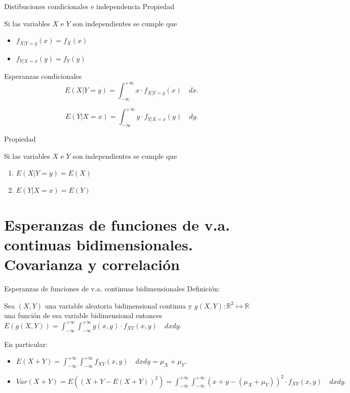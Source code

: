 \documentclass[
  ignorenonframetext,
]{beamer}
\providecommand{\tightlist}{%
  \setlength{\itemsep}{0pt}\setlength{\parskip}{0pt}}
\begin{document}
\begin{frame}{Distibuciones condicionales e independencia}
\protect\hypertarget{distibuciones-condicionales-e-independencia}{}
Propiedad

Si las variables \(X\) e \(Y\) son independientes se cumple que

\begin{itemize}
\tightlist
\item
  \(f_{X|Y=y}(x)=f_X(x)\)
\item
  \(f_{Y|X=x}(y)=f_Y(y)\)
\end{itemize}
\end{frame}

\begin{frame}{Esperanzas condicionales}
\protect\hypertarget{esperanzas-condicionales}{}
\[E(X|Y=y)=\int_{-\infty}^{+\infty} x\cdot f_{X|Y=y}(x) \quad dx.\]

\[E(Y|X=x)=\int_{-\infty}^{+\infty} y\cdot f_{Y|X=x}(y) \quad dy.\]

Propiedad

Si las variables \(X\) e \(Y\) son independientes se cumple que

\begin{enumerate}
\tightlist
\item
  \(E(X|Y=y)=E(X)\)
\item
  \(E(Y|X=x)=E(Y)\)
\end{enumerate}
\end{frame}

\hypertarget{esperanzas-de-funciones-de-v.a.-continuas-bidimensionales.-covarianza-y-correlaciuxf3n}{%
\section{Esperanzas de funciones de v.a. continuas bidimensionales.
Covarianza y
correlación}\label{esperanzas-de-funciones-de-v.a.-continuas-bidimensionales.-covarianza-y-correlaciuxf3n}}

\begin{frame}{Esperanzas de funciones de v.a. continuas bidimensionales}
\protect\hypertarget{esperanzas-de-funciones-de-v.a.-continuas-bidimensionales}{}
Definición:

Sea \((X,Y)\) una variable aleatoria bidimensional continua y
\(g(X,Y): \mathbb{R}^2\mapsto \mathbb{R}\) una función de esa variable
bidimensional entonces
\(E(g(X,Y))=\int_{-\infty}^{+\infty}\int_{-\infty}^{+\infty} g(x,y) \cdot f_{XY}(x,y) \quad dx dy.\)

En particular:

\begin{itemize}
\tightlist
\item
  \(\displaystyle E(X+Y)=\int_{-\infty}^{+\infty}\int_{-\infty}^{+\infty} f_{XY}(x,y) \quad dx dy=\mu_X+\mu_Y.\)
\item
  \(\displaystyle Var(X+Y)=E\left(\left(X+Y-E(X+Y)\right)^2\right)=\int_{-\infty}^{+\infty}\int_{-\infty}^{+\infty}(x+y-(\mu_X+\mu_Y))^2\cdot f_{XY}(x,y) \quad dx dy.\)
\end{itemize}
\end{frame}
\end{document}
